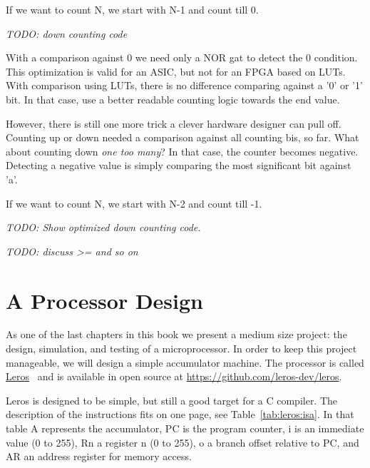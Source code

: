 \documentclass[%
    10pt, %
    headinclude, footexclude,
    openright, %
    notitlepage,
    cleardoubleempty,
    headsepline,
    pointlessnumbers,
    bibtotoc, idxtotoc,
    ]{scrbook}
\newcommand{\todo}[1]{{\emph{TODO: #1}}}
\newcommand{\myref}[2]{\href{#1}{#2}}
\begin{document}
If we want to count N, we start with N-1 and count till 0.

\todo{down counting code}

With a comparison against 0 we need only a NOR gat to detect the 0 condition.
This optimization is valid for an ASIC, but not for an FPGA based on LUTs.
With comparison using LUTs, there is no difference comparing against a '0' or
'1' bit. In that case, use a better readable counting logic towards the end value.

However, there is still one more trick a clever hardware designer can pull off.
Counting up or down needed a comparison against all counting bis, so far.
What about counting down \emph{one too many}? In that case, the counter
becomes negative. Detecting a negative value is simply comparing the
most significant bit against 'a'.

If we want to count N, we start with N-2 and count till -1.

\todo{Show optimized down counting code.}

\todo{discuss >= and so on}

\chapter{A Processor Design}

As one of the last chapters in this book we present a medium size project:
the design, simulation, and testing of a microprocessor.
In order to keep this project manageable, we will design a simple accumulator
machine.
The processor is called \myref{https://leros-dev.github.io/}{Leros}~\cite{leros:arcs2019}
and is available in open source at \url{https://github.com/leros-dev/leros}.

Leros is designed to be simple, but still a good target for a C compiler.
The description of the instructions fits on one page, see Table~\ref{tab:leros:isa}.
In that table A represents the accumulator, PC is the program counter,
i is an immediate value (0 to 255), Rn a register
n (0 to 255), o a branch offset relative to PC, and AR an address register for memory access.
\end{document}
